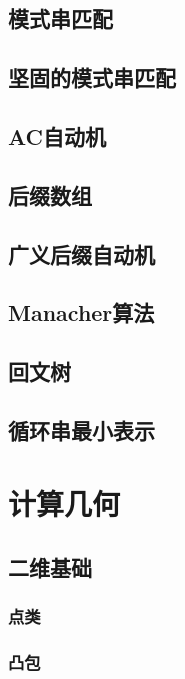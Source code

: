 \documentclass[openany, a4paper, 10pt]{book}
\begin{document}
\begin{spacing}{1.0}
		\section{模式串匹配}
			
		\section{坚固的模式串匹配}
			
		\section{AC自动机}
			
		\section{后缀数组}
			
		\section{广义后缀自动机}
			
		\section{Manacher算法}
			
		\section{回文树}
			
		\section{循环串最小表示}
			
	\chapter{计算几何}
		\section{二维基础}
			\subsection{点类}
				
			\subsection{凸包}
				

\end{spacing}
\end{document}
